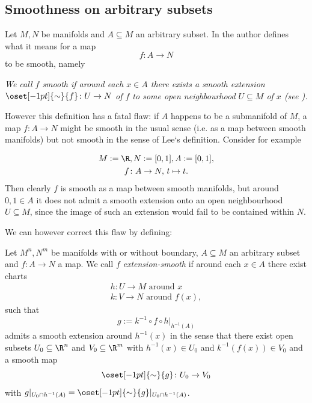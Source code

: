 \subsection{Smoothness on arbitrary subsets}

Let $M,N$ be manifolds and $A \subseteq M$ an arbitrary subset. In \cite{lee2011smooth} the author defines what it means for a map
\[
f \colon A \to N
\]
to be smooth, namely
\begin{center}
    \textit{We call $f$ smooth if around each $x \in A$ there exists a smooth extension $\oset[-1pt]{\sim}{f} \colon U \to N$ of $f$ to some open neighbourhood $U \subseteq M$ of $x$ (see \cite[p. 45]{lee2011smooth}).}
\end{center}
However this definition has a fatal flaw: if $A$ happens to be a submanifold of $M$, a map $f \colon A \to N$ might be smooth in the usual sense (i.e. as a map between smooth manifolds) but not smooth in the sense of Lee`s definition. Consider for example
\begin{counterexample}
    \label{ex:extension_smooth}
    \begin{gather*}
        M := \R, N:= [0,1], A := [0,1], \\
        f \colon A \to N, \, t \mapsto t.   
    \end{gather*}
    Then clearly $f$ is smooth as a map between smooth manifolds, but around $0,1 \in A$ it does not admit a smooth extension onto an open neighbourhood $U \subseteq M$, since the image of such an extension would fail to be contained within $N$. 
\end{counterexample}
We can however correct this flaw by defining:

\begin{definition}
    \label{def:extension_smooth}
    Let $M^n,N^m$ be manifolds with or without boundary, $A \subseteq M$ an arbitrary subset and $f \colon A \to N$ a map. We call $f$ \textit{extension-smooth} if around each $x \in A$ there exist charts
    \begin{gather*}
        h \colon U \to M \text{ around } x\\
        k \colon V \to N \text{ around } f(x),
    \end{gather*}
    such that
    \[
    g:= k^{-1} \circ f \circ h|_{h^{-1}(A)}
    \]
    admits a smooth extension around $h^{-1}(x)$ in the sense that there exist open subsets $U_0 \subseteq \R^n$ and $V_0 \subseteq \R^m$ with $h^{-1}(x) \in U_0$ and $k^{-1}(f(x)) \in V_0$ and a smooth map 
    \[
    \oset[-1pt]{\sim}{g} \colon U_0 \to V_0
    \]
    with $g|_{U_0 \cap h^{-1}(A)} = \oset[-1pt]{\sim}{g}|_{U_0 \cap h^{-1}(A)}$.
\end{definition}


